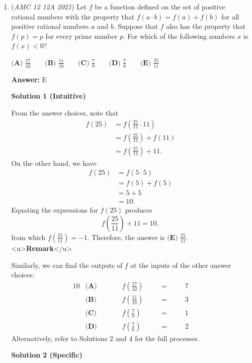 \begin{enumerate}
 


	\item (\textit{AMC 12 12A 2021}) Let $f$ be a function defined on the set of positive rational numbers with the property that $f(a\cdot b)=f(a)+f(b)$ for all positive rational numbers $a$ and $b$. Suppose that $f$ also has the property that $f(p)=p$ for every prime number $p$. For which of the following numbers $x$ is $f(x)<0$?


 $\textbf{(A) }\frac{17}{32} \qquad \textbf{(B) }\frac{11}{16} \qquad \textbf{(C) }\frac79 \qquad \textbf{(D) }\frac76\qquad \textbf{(E) }\frac{25}{11}$

 \textbf{Answer: }E



\textbf{Solution 1 (Intuitive)}

From the answer choices, note that
 \begin{align*} f(25)&=f\left(\frac{25}{11}\cdot11\right) \\ &=f\left(\frac{25}{11}\right)+f(11) \\ &=f\left(\frac{25}{11}\right)+11. \end{align*}
On the other hand, we have
 \begin{align*} f(25)&=f(5\cdot5) \\ &=f(5)+f(5) \\ &=5+5 \\ &=10. \end{align*}
Equating the expressions for $f(25)$ produces 
 \[f\left(\frac{25}{11}\right)+11=10,\] from which $f\left(\frac{25}{11}\right)=-1.$ Therefore, the answer is $\boxed{\textbf{(E) }\frac{25}{11}}.$
<u>\textbf{Remark}</u>

 Similarly, we can find the outputs of $f$ at the inputs of the other answer choices:
 \begin{alignat*}{10} &\textbf{(A)} \qquad && f\left(\frac{17}{32}\right) \quad && = \quad && 7 \\  &\textbf{(B)} \qquad && f\left(\frac{11}{16}\right) \quad && = \quad && 3 \\  &\textbf{(C)} \qquad && f\left(\frac{7}{9}\right) \quad && = \quad && 1 \\  &\textbf{(D)} \qquad && f\left(\frac{7}{6}\right) \quad && = \quad && 2 \end{alignat*}Alternatively, refer to Solutions 2 and 4 for the full processes.

 



\textbf{Solution 2 (Specific)}


\end{enumerate}
